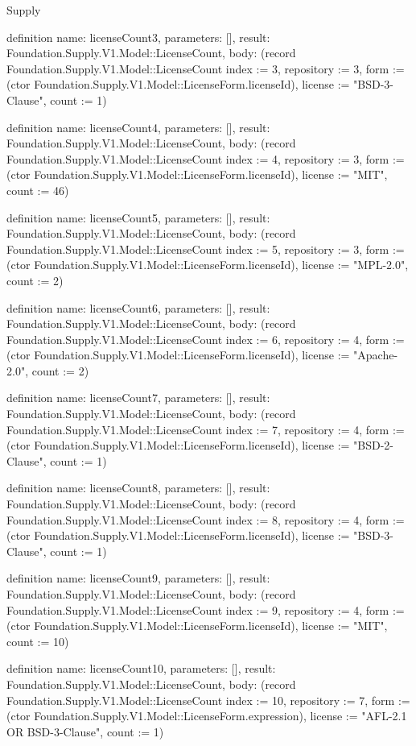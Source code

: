 \begin{lexlean}{Supply}
\begin{semanticmodule}
definition{
  name: licenseCount3,
  parameters: [],
  result: Foundation.Supply.V1.Model::LicenseCount,
  body: (record Foundation.Supply.V1.Model::LicenseCount {index := 3, repository := 3, form := (ctor Foundation.Supply.V1.Model::LicenseForm.licenseId), license := "BSD-3-Clause", count := 1})
}

definition{
  name: licenseCount4,
  parameters: [],
  result: Foundation.Supply.V1.Model::LicenseCount,
  body: (record Foundation.Supply.V1.Model::LicenseCount {index := 4, repository := 3, form := (ctor Foundation.Supply.V1.Model::LicenseForm.licenseId), license := "MIT", count := 46})
}

definition{
  name: licenseCount5,
  parameters: [],
  result: Foundation.Supply.V1.Model::LicenseCount,
  body: (record Foundation.Supply.V1.Model::LicenseCount {index := 5, repository := 3, form := (ctor Foundation.Supply.V1.Model::LicenseForm.licenseId), license := "MPL-2.0", count := 2})
}

definition{
  name: licenseCount6,
  parameters: [],
  result: Foundation.Supply.V1.Model::LicenseCount,
  body: (record Foundation.Supply.V1.Model::LicenseCount {index := 6, repository := 4, form := (ctor Foundation.Supply.V1.Model::LicenseForm.licenseId), license := "Apache-2.0", count := 2})
}

definition{
  name: licenseCount7,
  parameters: [],
  result: Foundation.Supply.V1.Model::LicenseCount,
  body: (record Foundation.Supply.V1.Model::LicenseCount {index := 7, repository := 4, form := (ctor Foundation.Supply.V1.Model::LicenseForm.licenseId), license := "BSD-2-Clause", count := 1})
}

definition{
  name: licenseCount8,
  parameters: [],
  result: Foundation.Supply.V1.Model::LicenseCount,
  body: (record Foundation.Supply.V1.Model::LicenseCount {index := 8, repository := 4, form := (ctor Foundation.Supply.V1.Model::LicenseForm.licenseId), license := "BSD-3-Clause", count := 1})
}

definition{
  name: licenseCount9,
  parameters: [],
  result: Foundation.Supply.V1.Model::LicenseCount,
  body: (record Foundation.Supply.V1.Model::LicenseCount {index := 9, repository := 4, form := (ctor Foundation.Supply.V1.Model::LicenseForm.licenseId), license := "MIT", count := 10})
}

definition{
  name: licenseCount10,
  parameters: [],
  result: Foundation.Supply.V1.Model::LicenseCount,
  body: (record Foundation.Supply.V1.Model::LicenseCount {index := 10, repository := 7, form := (ctor Foundation.Supply.V1.Model::LicenseForm.expression), license := "AFL-2.1 OR BSD-3-Clause", count := 1})
}


\end{semanticmodule}
\end{lexlean}
